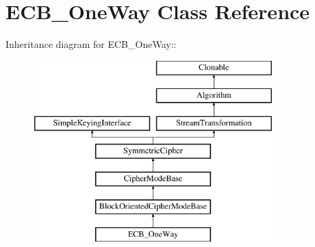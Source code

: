 \hypertarget{class_e_c_b___one_way}{
\section{ECB\_\-OneWay Class Reference}
\label{class_e_c_b___one_way}
}
Inheritance diagram for ECB\_\-OneWay::\begin{figure}[H]
\begin{center}
\leavevmode
\includegraphics[height=7cm]{class_e_c_b___one_way}
\end{center}
\end{figure}
